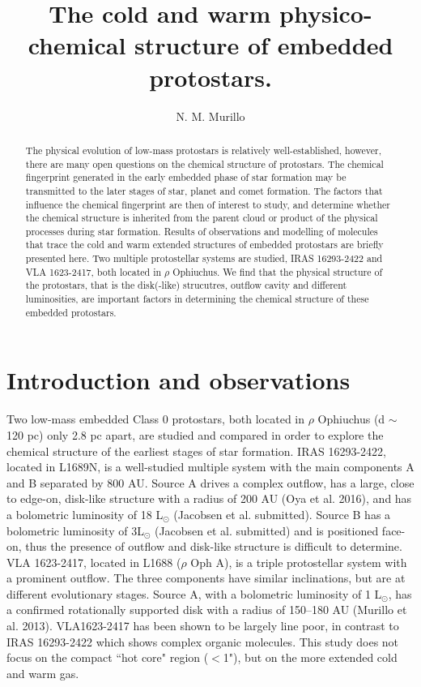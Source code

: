 \documentclass{iaus}
\title[Cold and warm protostellar structure]{The cold and warm physico-chemical structure of embedded protostars.}
\author[N. M. Murillo]{N. M. Murillo}
\affiliation{Leiden Observatory, Leiden University, P.O. Box 9513, 2300 RA, Leiden, the Netherlands \\ email: {\tt nmurillo@strw.leidenuniv.nl}}
\begin{document}
\maketitle

\begin{abstract}
The physical evolution of low-mass protostars is relatively well-established, however, there are many open questions on the chemical structure of protostars.
The chemical fingerprint generated in the early embedded phase of star formation may be transmitted to the later stages of star, planet and comet formation.
The factors that influence the chemical fingerprint are then of interest to study, and determine whether the chemical structure is inherited from the parent cloud or product of the physical processes during star formation.
Results of observations and modelling of molecules that trace the cold and warm extended structures of embedded protostars are briefly presented here.
Two multiple protostellar systems are studied, IRAS 16293-2422 and VLA 1623-2417, both located in $\rho$ Ophiuchus.
We find that the physical structure of the protostars, that is the disk(-like) strucutres, outflow cavity and different luminosities, are important factors in determining the chemical structure of these embedded protostars.
\end{abstract}

\firstsection 
\section{Introduction and observations}

Two low-mass embedded Class 0 protostars, both located in $\rho$ Ophiuchus (d $\sim$ 120 pc) only 2.8 pc apart, are studied and compared in order to explore the chemical structure of the earliest stages of star formation.
IRAS 16293-2422, located in L1689N, is a well-studied multiple system with the main components A and B separated by 800 AU.
Source A drives a complex outflow, has a large, close to edge-on, disk-like structure with a radius of 200 AU (Oya et al. 2016), and has a bolometric luminosity of 18 L$_{\odot}$ (Jacobsen et al. submitted).
Source B has a bolometric luminosity of 3L$_{\odot}$ (Jacobsen et al. submitted) and is positioned face-on, thus the presence of outflow and disk-like structure is difficult to determine.
VLA 1623-2417, located in L1688 ($\rho$ Oph A), is a triple protostellar system with a prominent outflow. The three components have similar inclinations, but are at different evolutionary stages. Source A, with a bolometric luminosity of 1 L$_{\odot}$, has a confirmed rotationally supported disk with a radius of 150--180 AU (Murillo et al. 2013). VLA1623-2417 has been shown to be largely line poor, in contrast to IRAS 16293-2422 which shows complex organic molecules.
This study does not focus on the compact ``hot core" region ($<$1"), but on the more extended cold and warm gas.
\end{document}
